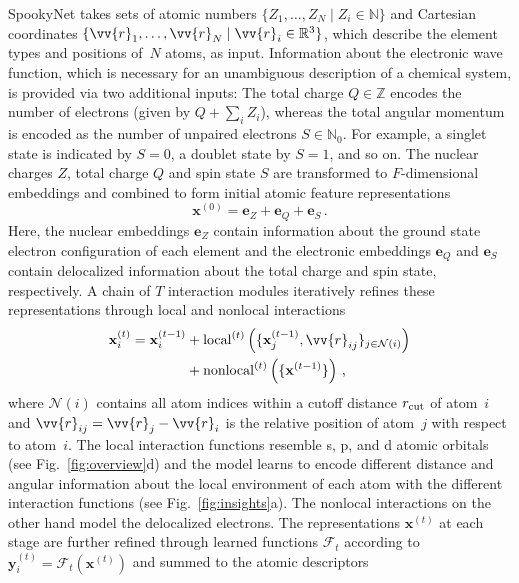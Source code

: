 \documentclass[%
superscriptaddress,
reprint,
nofootinbib,
amsmath,amssymb,amsfonts,
floatfix,
altaffilletter,
showkeys,
]{revtex4-2}
\newcommand{\nn}{SpookyNet}
\begin{document}
\nn{} takes sets of atomic numbers $\{Z_1,\dots,Z_N \mid Z_i\in\mathbb{N}\}$ and Cartesian coordinates $\{\vv{r}_1,\dots,\vv{r}_N\mid \vv{r}_i\in\mathbb{R}^3 \}$, which describe the element types and positions of~$N$ atoms, as input. Information about the electronic wave function, which is necessary for an unambiguous description of a chemical system, is provided via two additional inputs: The total charge $Q\in\mathbb{Z}$ encodes the number of electrons (given by $Q + \sum_i Z_i$), whereas the total angular momentum is encoded as the number of unpaired electrons $S\in\mathbb{N}_0$. For example, a singlet state is indicated by $S=0$, a doublet state by $S=1$, and so on.
The nuclear charges $Z$, total charge $Q$ and spin state $S$ are transformed to $F$-dimensional embeddings and combined to form initial atomic feature representations
\begin{equation}
\mathbf{x}^{(0)} = \mathbf{e}_Z + \mathbf{e}_Q + \mathbf{e}_S \,.
\label{eq:initial_atomic_features}
\end{equation}
Here, the nuclear embeddings $\mathbf{e}_Z$ contain information about the ground state electron configuration of each element and the electronic embeddings $\mathbf{e}_Q$ and $\mathbf{e}_S$ contain delocalized information about the total charge and spin state, respectively.
A chain of $T$ interaction modules iteratively refines these representations through local and nonlocal interactions
\begin{equation}
\begin{aligned}
\mathbf{x}_i^{(t)} = \mathbf{x}_i^{(t-1)} &+ \mathrm{local}^{(t)}\left(\{\mathbf{x}_j^{(t-1)}, \vv{r}_{ij}\}_{j\in\mathcal{N}(i)}\right)\\
 &+\mathrm{nonlocal}^{(t)}\left(\{\mathbf{x}^{(t-1)}\}\right)\,,
\end{aligned}
\label{eq:high_level_interaction}
\end{equation}
where $\mathcal{N}(i)$ contains all atom indices within a cutoff distance $r_{\rm cut}$ of atom~$i$ and $\vv{r}_{ij} = \vv{r}_{j}-\vv{r}_{i}$ is the relative position of atom~$j$ with respect to atom~$i$. The local interaction functions resemble s, p, and d atomic orbitals (see Fig.~\ref{fig:overview}d) and the model learns to encode different distance and angular information about the local environment of each atom with the different interaction functions (see Fig.~\ref{fig:insights}a). The nonlocal interactions on the other hand model the delocalized electrons.
The representations $\mathbf{x}^{(t)}$ at each stage are further refined through learned functions $\mathcal{F}_t$ according to $\mathbf{y}_i^{(t)}=\mathcal{F}_t(\mathbf{x}^{(t)})$ and summed to the atomic descriptors
\end{document}
